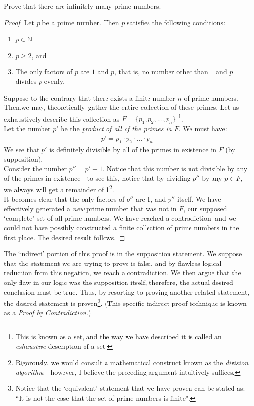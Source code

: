 \documentclass[../proofs.tex]{subfiles}
\begin{document}
\begin{expl}{Prove that there are infinitely many prime numbers.}
\begin{proof}
  Let $p$ be a prime number. Then $p$ satisfies the following conditions:
    \begin{enumerate}
      \item $p \in \mathbb{N}$
      \item $p \geq 2$, and
      \item The only factors of $p$ are $1$ and $p$, that is, no number other than $1$ and $p$ divides $p$ evenly.
    \end{enumerate}
  Suppose to the contrary that there exists a finite number $n$ of prime numbers. \\
  Then,we may, theoretically, gather the entire collection of these primes. Let us exhaustively describe this collection as $F = \{p_1, p_2, ..., p_n\}$ \footnote{This is known as a set, and the way we have described it is called an \emph{exhaustive} description of a set.}. \\
  Let the number $p'$ be the \emph{product of all of the primes in $F$}. We must have:
  \begin{align*}
    p' = p_1 \cdot p_2 \cdot ... \cdot p_n
  \end{align*}
  We see that $p'$ is definitely divisible by all of the primes in existence in $F$ (by supposition). \\
  Consider the number $p''  = p' + 1$. Notice that this number is not divisible by any of the primes in existence - to see this, notice that by dividing $p'' $ by any $p \in F$, we always will get a remainder of 1\footnote{Rigorously, we would consult a mathematical construct known as the \emph{division algorithm} - however, I believe the preceding argument intuitively suffices.}.\\

  It becomes clear that the only factors of $p''$ are 1, and $p''$ itself. We have effectively generated a \emph{new} prime number that was not in $F$, our supposed `complete' set of all prime numbers. We have reached a contradiction, and we could not have possibly constructed a finite collection of prime numbers in the first place. The desired result follows.
  \end{proof}
\end{expl}
The `indirect' portion of this proof is in the supposition statement. We suppose that the statement we are trying to prove is false, and by flawless logical reduction from this negation, we reach a contradiction. We then argue that the only flaw in our logic was the supposition itself, therefore, the actual desired conclusion must be true. Thus, by resorting to proving another related statement, the desired statement is proven\footnote{Notice that the `equivalent' statement that we have proven can be stated as: ``It is not the case that the set of prime numbers is finite".}. (This specific indirect proof technique is known as a \emph{Proof by Contradiction.})
\end{document}
